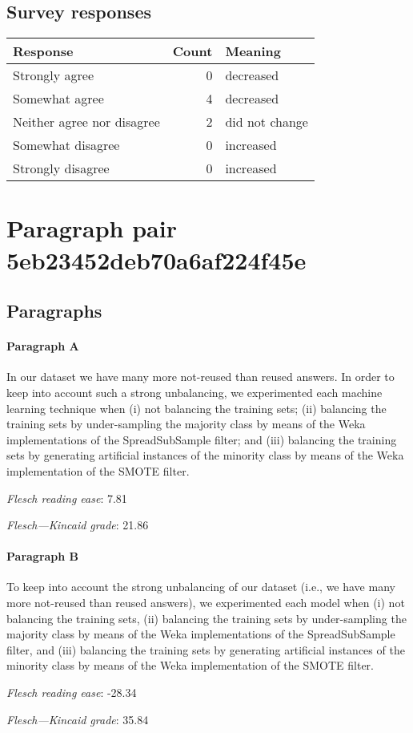 \subsection{Survey responses}
\begin{tabular}{lrl}
\toprule
          \textbf{Response} &  \textbf{Count} & \textbf{Meaning} \\
\midrule
             Strongly agree &               0 &        decreased \\
             Somewhat agree &               4 &        decreased \\
 Neither agree nor disagree &               2 &   did not change \\
          Somewhat disagree &               0 &        increased \\
          Strongly disagree &               0 &        increased \\
\bottomrule
\end{tabular}

\section{Paragraph pair 5eb23452deb70a6af224f45e}
\subsection{Paragraphs}
\paragraph{Paragraph A}
In our dataset we have many more not-reused than reused answers. In order to keep into account such a strong unbalancing, we experimented each machine learning technique when (i) not balancing the training sets; (ii) balancing the training sets by under-sampling the majority class by means of the Weka implementations of the SpreadSubSample filter; and (iii) balancing the training sets by generating artificial instances of the minority class by means of the Weka implementation of the SMOTE filter.\par\medskip
\emph{Flesch reading ease}: 7.81\par
\emph{Flesch---Kincaid grade}: 21.86

\paragraph{Paragraph B}
To keep into account the strong unbalancing of our dataset (i.e., we have many more not-reused than reused answers), we experimented each model when (i) not balancing the training sets, (ii) balancing the training sets by under-sampling the majority class by means of the Weka implementations of the SpreadSubSample filter, and (iii) balancing the training sets by generating artificial instances of the minority class by means of the Weka implementation of the SMOTE filter.\par\medskip
\emph{Flesch reading ease}: -28.34\par
\emph{Flesch---Kincaid grade}: 35.84

